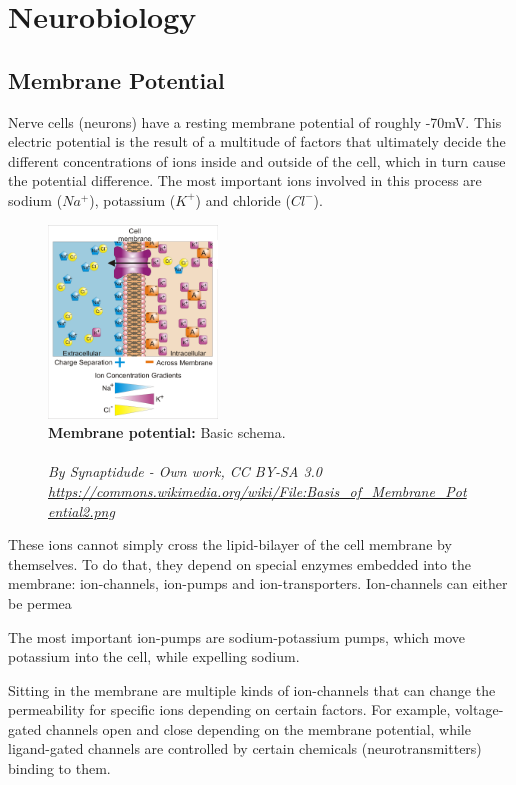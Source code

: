 \section{Neurobiology}
 \qquad {}
\subsection{Membrane Potential}
Nerve cells (neurons) have a resting membrane potential of roughly -70mV. This electric potential is the result of a multitude of factors that ultimately decide the different concentrations of ions inside and outside of the cell, which in turn cause the potential difference. The most important ions involved in this process are sodium ($Na^+$), potassium ($K^+$) and chloride ($Cl^-$).
\begin{figure}
		\centering
		\includegraphics[width=0.40\textwidth]{Figures/neurobiology/membrane_potential.png}
		\caption{\textbf{Membrane potential:} Basic schema. \\ \hrulefill \\ \textit{By Synaptidude - Own work, CC BY-SA 3.0  \url{https://commons.wikimedia.org/wiki/File:Basis_of_Membrane_Potential2.png} } } 
		\label{fig:MembranePotential}
\end{figure}
These ions cannot simply cross the lipid-bilayer of the cell membrane by themselves. To do that, they depend on special enzymes embedded into the membrane: ion-channels, ion-pumps and ion-transporters.
Ion-channels can either be permea

The most important ion-pumps are sodium-potassium pumps, which move potassium into the cell, while expelling sodium.

Sitting in the membrane are multiple kinds of ion-channels that can change the permeability for specific ions depending on certain factors. For example, voltage-gated channels open and close depending on the membrane potential, while ligand-gated channels are controlled by certain chemicals (neurotransmitters) binding to them.



